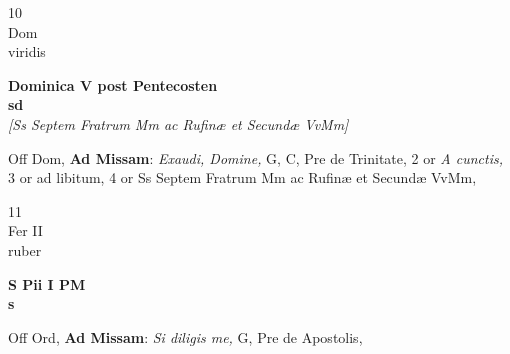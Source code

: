 \documentclass[10pt, openany]{book}
\begin{document}
        \begin{center}
            \begin{minipage}{3.5in}
                \vspace{2em}
                \begin{minipage}{0.5in}
                    {\Huge 10} \\
                    {\normalsize Dom} \\
                    {\normalsize viridis}
                \end{minipage}
                \begin{minipage}{3.0in}
                    \textbf{ \large Dominica V post Pentecosten \\
                    \textnormal{\normalsize sd}} \\ \textit{[Ss Septem Fratrum Mm ac Rufinæ et Secundæ VvMm]} \\ 
                \end{minipage}
                \begin{justify}Off Dom, \textbf{Ad Missam}: \textit{Exaudi, Domine,} G, C, Pre de Trinitate, 2 or \textit{A cunctis,} 3 or ad libitum, 4 or Ss Septem Fratrum Mm ac Rufinæ et Secundæ VvMm,  
                \end{justify}
            \end{minipage}
        \end{center}
    
        \begin{center}
            \begin{minipage}{3.5in}
                \vspace{2em}
                \begin{minipage}{0.5in}
                    {\Huge 11} \\
                    {\normalsize Fer II} \\
                    {\normalsize ruber}
                \end{minipage}
                \begin{minipage}{3.0in}
                    \textbf{ \large S Pii I PM \\
                    \textnormal{\normalsize s}} \\ 
                \end{minipage}
                \begin{justify}Off Ord, \textbf{Ad Missam}: \textit{Si diligis me,} G, Pre de Apostolis,  
                \end{justify}
            \end{minipage}
        \end{center}
    
\end{document}
